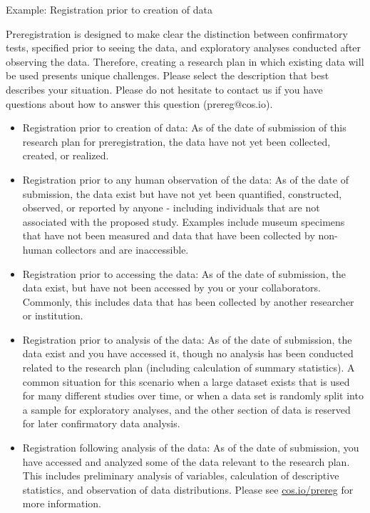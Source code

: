 \documentclass[highlight, explanations]{prereg}
\begin{document}
{Example: Registration prior to creation of data}
{Preregistration is designed to make clear the distinction between confirmatory tests, specified prior to seeing the data, and exploratory analyses conducted after observing the data. Therefore, creating a research plan in which existing data will be used presents unique challenges. Please select the description that best describes your situation. Please do not hesitate to contact us if you have questions about how to answer this question (prereg@cos.io).
\begin{itemize}
    \item Registration prior to creation of data: As of the date of submission of this research plan for preregistration, the data have not yet been collected, created, or realized. 
    \item Registration prior to any human observation of the data: As of the date of submission, the data exist but have not yet been quantified, constructed, observed, or reported by anyone - including individuals that are not associated with the proposed study. Examples include museum specimens that have not been measured and data that have been collected by non-human collectors and are inaccessible.
    \item Registration prior to accessing the data: As of the date of submission, the data exist, but have not been accessed by you or your collaborators. Commonly, this includes data that has been collected by another researcher or institution.
    \item Registration prior to analysis of the data: As of the date of submission, the data exist and you have accessed it, though no analysis has been conducted related to the research plan (including calculation of summary statistics). A common situation for this scenario when a large dataset exists that is used for many different studies over time, or when a data set is randomly split into a sample for exploratory analyses, and the other section of data is reserved for later confirmatory data analysis.
    \item Registration following analysis of the data: As of the date of submission, you have accessed and analyzed some of the data relevant to the research plan. This includes preliminary analysis of variables, calculation of descriptive statistics, and observation of data distributions. Please see \url{cos.io/prereg} for more information. 
\end{itemize}
}
\end{document}
